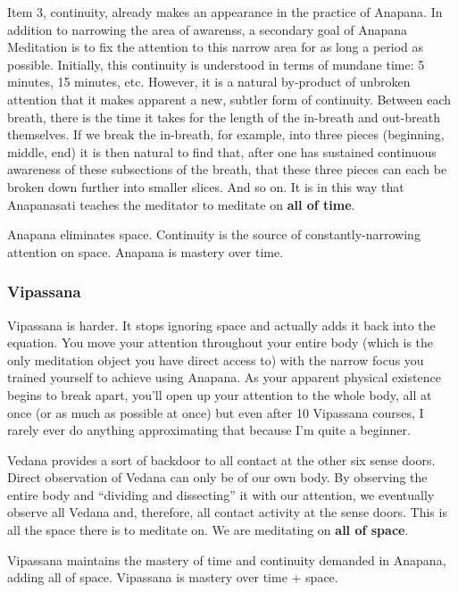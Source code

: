 \documentclass[a4paper, amsfonts, amssymb, amsmath, reprint, showkeys, nofootinbib, twoside]{revtex4-1}
\begin{document}
Item 3, continuity, already makes an appearance in the practice of Anapana. In
addition to narrowing the area of awarenss, a secondary goal of Anapana Meditation is
to fix the attention to this narrow area for as long a period as possible. Initially,
this continuity is understood in terms of mundane time: 5 minutes, 15 minutes,
etc. However, it is a natural by-product of unbroken attention that it makes apparent
a new, subtler form of continuity. Between each breath, there is the time it takes
for the length of the in-breath and out-breath themselves. If we break the in-breath,
for example, into three pieces (beginning, middle, end) it is then natural to find
that, after one has sustained continuous awareness of these subsections of the
breath, that these three pieces can each be broken down further into smaller
slices. And so on. It is in
this way that Anapanasati teaches the meditator to meditate on \textbf{all of time}.


Anapana eliminates space. Continuity is the source of constantly-narrowing attention
on space. Anapana is mastery over time.

\subsubsection{Vipassana}

Vipassana is harder. It stops ignoring space and actually adds it back into the
equation. You move your attention throughout your entire body (which is the only
meditation object you have direct access to) with the narrow focus you trained
yourself to achieve using Anapana. As your apparent physical
existence begins to break apart, you’ll open up your attention to the whole body, all
at once (or as much as possible at once) but even after 10 Vipassana courses, I rarely
ever do anything approximating that because I’m quite a beginner. 🙂

Vedana provides a sort of backdoor to all contact at the other six sense
doors. Direct observation of Vedana can only be of our own body. By observing the
entire body and ``dividing and dissecting'' it with our attention, we eventually
observe all Vedana and, therefore, all contact activity at the sense doors. This is
all the space there is to meditate on. We are meditating on \textbf{all of space}.

Vipassana maintains the mastery of time and continuity demanded in Anapana, adding
all of space. Vipassana is mastery over time + space.
\end{document}
